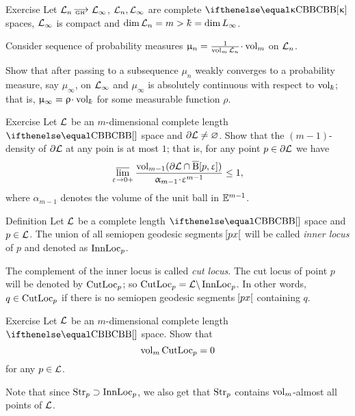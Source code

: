 \begin{thm}{Exercise}
Let $\spc{L}_n\GHto\spc{L}_\infty$,
$\mathcal{L}_n,\mathcal{L}_\infty$ are complete $\Alex\kappa$ spaces,
$\mathcal{L}_\infty$ is compact
and $\dim\spc{L}_n=m>\kay=\dim{L}_\infty$.

Consider sequence of probability measures 
$\mu_n=\tfrac{1}{\vol_m\spc{L}_n}\cdot\vol_m$
on $\mathcal{L}_n$.

Show that after passing to a subsequence $\mu_n$ weakly converges to a probability measure, say $\mu_\infty$, on $\mathcal{L}_\infty$ and $\mu_\infty$ is absolutely continuous with respect to $\vol_\kay$;
that is, $\mu_\infty=\rho\cdot\vol_\kay$
for some measurable function $\rho$.
\end{thm}








\begin{thm}{Exercise}
Let $\mathcal{L}$ be an $m$-dimensional complete length $\Alex{}$ space and $\partial \mathcal{L}\ne\varnothing$.
Show that the $(m-1)$-density of $\partial \mathcal{L}$ at any poin is at most $1$;
that is, 
for any point $p\in \partial \spc{L}$
we have
\[\limsup_{\eps\to0+}\frac{\vol_{m-1}(\partial\spc{L}\cap\cBall[p,\eps])}{\alpha_{m-1}\cdot \eps^{m-1}}\le 1,\]
where $\alpha_{m-1}$ denotes the volume of the unit ball in $\mathbb{E}^{m-1}$.
\end{thm}


\begin{thm}{Definition}
Let $\mathcal{L}$ be a complete length $\Alex{}$ space and $p\in \spc{L}$.
The union of all semiopen geodesic segments $\hskip-0.1em\left[px\right[$
will be called \emph{inner locus} of $p$ 
and denoted as $\mathop{\rm InnLoc}\nolimits_p$.

The complement of the inner locus
is called 
\emph{cut locus}.
The cut locus of point $p$ will be denoted by $\mathop{\rm CutLoc}\nolimits_p$;
so $\mathop{\rm CutLoc}\nolimits_p=\mathcal{L}\backslash\mathop{\rm InnLoc}\nolimits_p$.
In other words, $q\in \CutLoc_p$ if there is no semiopen geodesic segments $\hskip-0.1em\left[px\right[$ containing $q$. 
\end{thm}


\begin{thm}{Exercise}
Let $\mathcal{L}$ be an $m$-dimensional complete length $\Alex{}$ space.
Show that
\[\mathop{\rm vol}\nolimits_m\mathop{\rm CutLoc}\nolimits_p=0\]
for any $p\in \spc{L}$.
\end{thm}

Note that since $\Str_p\supset \InnLoc_p$,
we also get that $\mathop{\rm Str}\nolimits_p$ contains $\mathop{\rm vol}\nolimits_m$-almost all points of $\mathcal{L}$.

